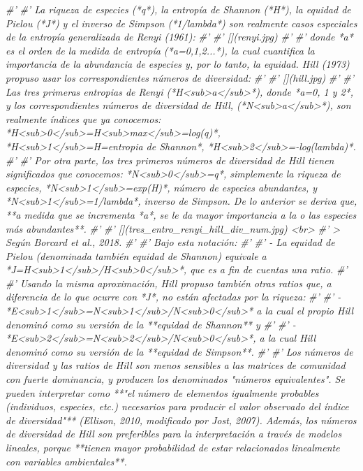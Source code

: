 \documentclass[11pt,]{article}
\newenvironment{Shaded}{\begin{snugshade}}{\end{snugshade}}
\newcommand{\CommentTok}[1]{\textcolor[rgb]{0.56,0.35,0.01}{\textit{#1}}}
\begin{document}
\begin{Shaded}
\begin{Highlighting}[]
{\CommentTok{#' }
\CommentTok{#' La riqueza de especies (*q*), la entropía de Shannon (*H*), la equidad de Pielou (*J*) y el inverso de Simpson (*1/lambda*) son realmente casos especiales de la entropía generalizada de Renyi (1961):}
\CommentTok{#' }
\CommentTok{#' [](renyi.jpg)}
\CommentTok{#' }
\CommentTok{#' donde *a* es el orden de la medida de entropía (*a=0,1,2...*), la cual cuantifica la importancia de la abundancia de especies y, por lo tanto, la equidad. Hill (1973) propuso usar los correspondientes números de diversidad:}
\CommentTok{#' }
\CommentTok{#' [](hill.jpg)}
\CommentTok{#' }
\CommentTok{#' Las tres primeras entropias de Renyi (*H<sub>a</sub>*), donde *a=0, 1 y 2*, y los correspondientes números de diversidad de Hill, (*N<sub>a</sub>*), son realmente índices que ya conocemos: *H<sub>0</sub>=H<sub>max</sub>=log(q)*, *H<sub>1</sub>=H=entropia de Shannon*, *H<sub>2</sub>=-log(lambda)*.}
\CommentTok{#' }
\CommentTok{#' Por otra parte, los tres primeros números de diversidad de Hill tienen significados que conocemos: *N<sub>0</sub>=q*, simplemente la riqueza de especies, *N<sub>1</sub>=exp(H)*, número de especies abundantes, y *N<sub>1</sub>=1/lambda*, inverso de Simpson. De lo anterior se deriva que, **a medida que se incrementa *a*, se le da mayor importancia a la o las especies más abundantes**.}
\CommentTok{#' }
\CommentTok{#' [](tres_entro_renyi_hill_div_num.jpg) <br> }
\CommentTok{#' > Según Borcard et al., 2018.}
\CommentTok{#' }
\CommentTok{#' Bajo esta notación:}
\CommentTok{#' }
\CommentTok{#' - La equidad de Pielou (denominada también equidad de Shannon) equivale a *J=H<sub>1</sub>/H<sub>0</sub>*, que es a fin de cuentas una ratio.}
\CommentTok{#' }
\CommentTok{#' Usando la misma aproximación, Hill propuso también otras ratios que, a diferencia de lo que ocurre con *J*, no están afectadas por la riqueza:}
\CommentTok{#' }
\CommentTok{#' - *E<sub>1</sub>=N<sub>1</sub>/N<sub>0</sub>* a la cual el propio Hill denominó como su versión de la **equidad de Shannon** y}
\CommentTok{#' }
\CommentTok{#' - *E<sub>2</sub>=N<sub>2</sub>/N<sub>0</sub>*, a la cual Hill denominó como su versión de la **equidad de Simpson**.}
\CommentTok{#' }
\CommentTok{#' Los números de diversidad y las ratios de Hill son menos sensibles a las matrices de comunidad con fuerte dominancia, y producen los denominados "números equivalentes". Se pueden interpretar como **"el número de elementos igualmente probables (individuos, especies, etc.) necesarios para producir el valor observado del índice de diversidad"** (Ellison, 2010, modificado por Jost, 2007). Además, los números de diversidad de Hill son preferibles para la interpretación a través de modelos lineales, porque **tienen mayor probabilidad de estar relacionados linealmente con variables ambientales**.}
}
\end{Highlighting}
\end{Shaded}
\end{document}

